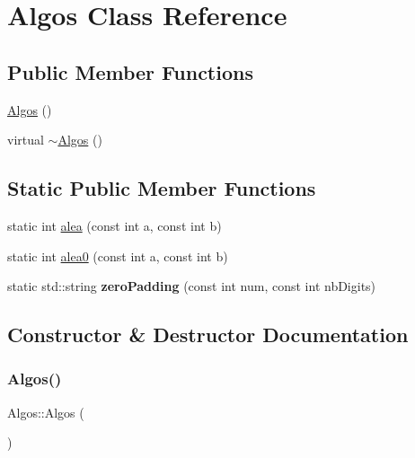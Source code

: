 \hypertarget{class_algos}{}\section{Algos Class Reference}
\label{class_algos}
\subsection*{Public Member Functions}
\begin{DoxyCompactItemize}
\item 
\mbox{\hyperlink{class_algos_a6c192d992402478fa8b6eda45c58b477}{Algos}} ()
\item 
virtual \mbox{\hyperlink{class_algos_a42e3acfd80bd78b2a5a9d08188296f02}{$\sim$\+Algos}} ()
\end{DoxyCompactItemize}
\subsection*{Static Public Member Functions}
\begin{DoxyCompactItemize}
\item 
static int \mbox{\hyperlink{class_algos_aeea47d178f5840b4586dc7f7d6166c17}{alea}} (const int a, const int b)
\item 
static int \mbox{\hyperlink{class_algos_a598ade8625d3bde87533c6355c521082}{alea0}} (const int a, const int b)
\item 
\mbox{\label{class_algos_ab734ff02843eea34d0b7f929c67e31e2}} 
static std\+::string {\bfseries zero\+Padding} (const int num, const int nb\+Digits)
\end{DoxyCompactItemize}


\subsection{Constructor \& Destructor Documentation}
\mbox{\label{class_algos_a6c192d992402478fa8b6eda45c58b477}} 
\subsubsection{\texorpdfstring{Algos()}{Algos()}}
{\footnotesize\ttfamily Algos\+::\+Algos (\begin{DoxyParamCaption}{ }\end{DoxyParamCaption})}

